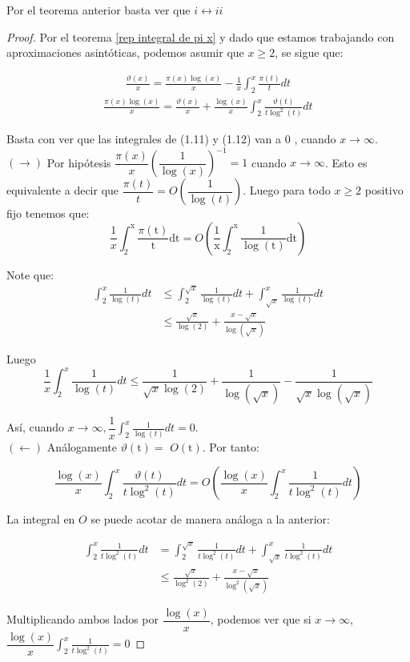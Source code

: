 Por el teorema anterior basta ver que $i \leftrightarrow ii$\\

 \begin{proof} Por el teorema \ref{rep integral de pi x} y dado que estamos trabajando con aproximaciones asintóticas, podemos asumir que $x\geq 2$, se sigue que:

 \begin{align}
     \frac{\vartheta(x)}{x}=\frac{\pi(x) \log (x)}{x}-\frac{1}{x} \int_2^x \frac{\pi(t)}{t} d t
 \end{align}
 \begin{align}
     \frac{\pi(x) \log (x)}{x}=\frac{\vartheta(x)}{x}+\frac{\log (x)}{x} \int_2^x \frac{\vartheta(t)}{t \log ^2(t)} d t
 \end{align}

Basta con ver que las integrales de (1.11) y (1.12) van a 0 , cuando $x \rightarrow \infty$.\\

$(\rightarrow)$ Por hipótesis $\dfrac{\pi(x)}{x}\left(\dfrac{1}{\log (x)}\right)^{-1}=1$ cuando $x \rightarrow \infty$. Esto es equivalente a decir que $\dfrac{\pi(t)}{t}=O\left(\dfrac{1}{\log (t)}\right)$. Luego para todo $x \geq 2$ positivo fijo tenemos que:
$$
\frac{1}{x} \int_2^{\mathrm{x}} \frac{\pi(\mathrm{t})}{\mathrm{t}} \mathrm{dt}=O\left(\frac{1}{\mathrm{x}} \int_2^{\mathrm{x}} \frac{1}{\log (\mathrm{t})} \mathrm{dt}\right)
$$

Note que:
$$
\begin{aligned}
\int_2^x \frac{1}{\log (t)} d t & \leq \int_2^{\sqrt{x}} \frac{1}{\log (t)} d t+\int_{\sqrt{x}}^x \frac{1}{\log (t)} d t \\
& \leq \frac{\sqrt{x}}{\log (2)}+\frac{x-\sqrt{x}}{\log (\sqrt{x})}
\end{aligned}
$$

Luego
$$
\frac{1}{x} \int_2^x \frac{1}{\log (t)} d t \leq \frac{1}{\sqrt{x} \log (2)}+\frac{1}{\log (\sqrt{x})}-\frac{1}{\sqrt{x} \log (\sqrt{x})}
$$

Así, cuando $x \rightarrow \infty, \dfrac{1}{x} \displaystyle \int_2^x \frac{1}{\log (t)} d t=0$.\\

$(\leftarrow)$ Análogamente $\vartheta(\mathrm{t})=$ $O(\mathrm{t})$. Por tanto:

$$
\frac{\log (x)}{x} \int_2^x \frac{\vartheta(t)}{t \log ^2(t)} d t=O\left(\frac{\log (x)}{x} \int_2^x \frac{1}{t \log ^2(t)} d t\right)
$$
 
 La integral en $O$ se puede acotar de manera análoga a la anterior:
 
$$
\begin{aligned}
\int_2^x \frac{1}{t \log ^2(t)} d t & =\int_2^{\sqrt{x}} \frac{1}{t \log ^2(t)} d t+\int_{\sqrt{x}}^x \frac{1}{t \log ^2(t)} d t \\
& \leq \frac{\sqrt{x}}{\log ^2(2)}+\frac{x-\sqrt{x}}{\log ^2(\sqrt{x})}
\end{aligned}
$$

Multiplicando ambos lados por $\dfrac{\log (x)}{x}$, podemos ver que si $x \rightarrow \infty$, $\dfrac{\log (x)}{x}\displaystyle \int_2^x \frac{1}{t \log ^2(t)}=0$
\end{proof}

